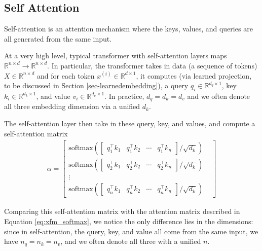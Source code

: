 \subsection{Self Attention}
Self-attention is an attention mechanism where the keys, values, and queries are all generated from the same input.

At a very high level, typical transformer with self-attention layers maps $\mathbb{R}^{n\times d} \longrightarrow \mathbb{R}^{n\times d}$. In particular, the transformer takes in data (a sequence of tokens) $X\in \mathbb{R}^{n\times d}$ and for each token $x^{(i)}\in \mathbb{R}^{d\times 1}$, it computes (via learned projection, to be discussed in Section \ref{sec-learnedembedding}), a query $q_i \in \mathbb{R}^{d_q\times 1}$, key $k_{i} \in \mathbb{R}^{d_k\times 1}$, and value $v_{i} \in \mathbb{R}^{d_v\times 1}$. In practice, $d_q=d_k=d_v$ and we often denote all three embedding dimension via a unified $d_k.$

The self-attention layer then take in these query, key, and values, and compute a self-attention matrix
\begin{eqnarray}
\alpha = \begin{bmatrix}
    \text{softmax}\left( \begin{bmatrix}
                           q_1^\top k_1 & q_1^\top k_2 & \cdots & q_1^\top k_{n}
                         \end{bmatrix} / \sqrt{d_k} \right) \\
    \text{softmax}\left( \begin{bmatrix}
                           q_2^\top k_1 & q_2^\top k_2 & \cdots & q_2^\top k_{n}
                         \end{bmatrix} / \sqrt{d_k} \right) \\
    \vdots &                                                                   \\
    \text{softmax}\left( \begin{bmatrix}
                           q_{n}^\top k_1 & q_{n}^\top k_2 & \cdots & q_{n}^\top k_{n}
                         \end{bmatrix} / \sqrt{d_k} \right)
  \end{bmatrix}
\end{eqnarray}\label{eq:self_softmax}

Comparing this self-attention matrix with the attention matrix described in Equation \ref{eq:xfm_softmax}, we notice the only difference lies in the dimensions: since in self-attention, the query, key, and value all come from the same input, we have $n_q=n_k=n_v$, and we often denote all three with a unified $n$.


